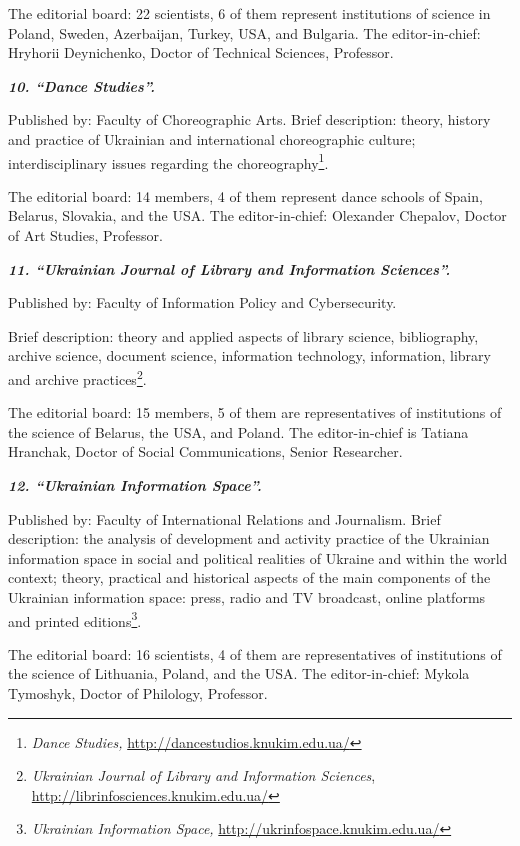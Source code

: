 \documentclass[a4paper,
fontsize=11pt,
oneside,
numbers=noperiodatend,
parskip=half-,
bibliography=totoc,
final
]{scrartcl}
\begin{document}
The editorial board: 22 scientists, 6 of them represent institutions of
science in Poland, Sweden, Azerbaijan, Turkey, USA, and Bulgaria. The
editor-in-chief: Hryhorii Deynichenko, Doctor of Technical Sciences,
Professor.

\textbf{\emph{10. \enquote{Dance Studies}.}}

Published by: Faculty of Choreographic Arts. Brief description: theory,
history and practice of Ukrainian and international choreographic
culture; interdisciplinary issues regarding the choreography\footnote{\emph{Dance
  Studies,} \url{http://dancestudios.knukim.edu.ua/}}.

The editorial board: 14 members, 4 of them represent dance schools of
Spain, Belarus, Slovakia, and the USA. The editor-in-chief: Olexander
Chepalov, Doctor of Art Studies, Professor.

\textbf{\emph{11. \enquote{Ukrainian Journal of Library and Information
Sciences}.}}

Published by: Faculty of Information Policy and Cybersecurity.

Brief description: theory and applied aspects of library science,
bibliography, archive science, document science, information technology,
information, library and archive practices\footnote{\emph{Ukrainian
  Journal of Library and Information Sciences},
  \url{http://librinfosciences.knukim.edu.ua/}}.

The editorial board: 15 members, 5 of them are representatives of
institutions of the science of Belarus, the USA, and Poland. The
editor-in-chief is Tatiana Hranchak, Doctor of Social Communications,
Senior Researcher.

\textbf{\emph{12. \enquote{Ukrainian Information Space}.}}

Published by: Faculty of International Relations and Journalism. Brief
description: the analysis of development and activity practice of the
Ukrainian information space in social and political realities of Ukraine
and within the world context; theory, practical and historical aspects
of the main components of the Ukrainian information space: press, radio
and TV broadcast, online platforms and printed editions\footnote{\emph{Ukrainian
  Information Space,} \url{http://ukrinfospace.knukim.edu.ua/}}.

The editorial board: 16 scientists, 4 of them are representatives of
institutions of the science of Lithuania, Poland, and the USA. The
editor-in-chief: Mykola Tymoshyk, Doctor of Philology, Professor.
\end{document}
